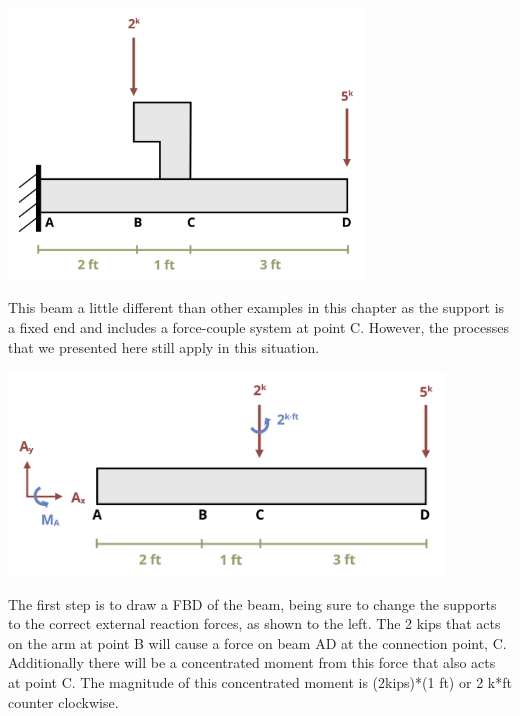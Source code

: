 \documentclass[
  letterpaper,
  DIV=11,
  numbers=noendperiod]{scrreprt}
\begin{document}
\begin{tcolorbox}[enhanced jigsaw, colback=white, colframe=quarto-callout-note-color-frame, leftrule=.75mm, opacitybacktitle=0.6, colbacktitle=quarto-callout-note-color!10!white, arc=.35mm, bottomrule=.15mm, breakable, title={Example 7.4: Draw the shear and moment for the beam shown}, left=2mm, titlerule=0mm, toptitle=1mm, toprule=.15mm, opacityback=0, rightrule=.15mm, coltitle=black, bottomtitle=1mm]

\begin{center}
\includegraphics[width=3.70833in,height=\textheight]{images/CH7 PNGs/example 7.4 part 1.png}
\end{center}

This beam a little different than other examples in this chapter as the
support is a fixed end and includes a force-couple system at point C.
However, the processes that we presented here still apply in this
situation.

\begin{center}
\includegraphics[width=4.5625in,height=\textheight]{images/CH7 PNGs/example 7.4 part 2.png}
\end{center}

The first step is to draw a FBD of the beam, being sure to change the
supports to the correct external reaction forces, as shown to the left.
The 2 kips that acts on the arm at point B will cause a force on beam AD
at the connection point, C. Additionally there will be a concentrated
moment from this force that also acts at point C. The magnitude of this
concentrated moment is (2kips)*(1 ft) or 2 k*ft counter clockwise.


\end{tcolorbox}
\end{document}
